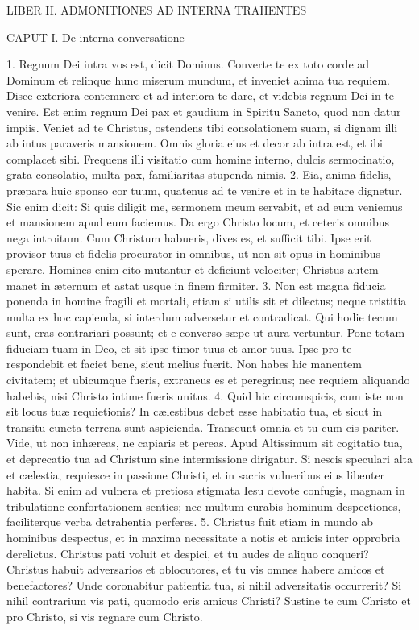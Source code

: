 \documentclass[twoside]{article}
\begin{document}
LIBER II.
ADMONITIONES AD INTERNA TRAHENTES


CAPUT I.
De interna conversatione

1. Regnum Dei intra vos est, dicit Dominus. Converte te ex toto corde ad Dominum et relinque hunc miserum mundum, et inveniet anima tua requiem. Disce exteriora contemnere et ad interiora te dare, et videbis regnum Dei in te venire. Est enim regnum Dei pax et gaudium in Spiritu Sancto, quod non datur impiis. Veniet ad te Christus, ostendens tibi consolationem suam, si dignam illi ab intus paraveris mansionem. Omnis gloria eius et decor ab intra est, et ibi complacet sibi. Frequens illi visitatio cum homine interno, dulcis sermocinatio, grata consolatio, multa pax, familiaritas stupenda nimis.
2. Eia, anima fidelis, præpara huic sponso cor tuum, quatenus ad te venire et in te habitare dignetur. Sic enim dicit: Si quis diligit me, sermonem meum servabit, et ad eum veniemus et mansionem apud eum faciemus. Da ergo Christo locum, et ceteris omnibus nega introitum. Cum Christum habueris, dives es, et sufficit tibi. Ipse erit provisor tuus et fidelis procurator in omnibus, ut non sit opus in hominibus sperare. Homines enim cito mutantur et deficiunt velociter; Christus autem manet in æternum et astat usque in finem firmiter.
3. Non est magna fiducia ponenda in homine fragili et mortali, etiam si utilis sit et dilectus; neque tristitia multa ex hoc capienda, si interdum adversetur et contradicat. Qui hodie tecum sunt, cras contrariari possunt; et e converso sæpe ut aura vertuntur. Pone totam fiduciam tuam in Deo, et sit ipse timor tuus et amor tuus. Ipse pro te respondebit et faciet bene, sicut melius fuerit. Non habes hic manentem civitatem; et ubicumque fueris, extraneus es et peregrinus; nec requiem aliquando habebis, nisi Christo intime fueris unitus.
4. Quid hic circumspicis, cum iste non sit locus tuæ requietionis? In cælestibus debet esse habitatio tua, et sicut in transitu cuncta terrena sunt aspicienda. Transeunt omnia et tu cum eis pariter. Vide, ut non inhæreas, ne capiaris et pereas. Apud Altissimum sit cogitatio tua, et deprecatio tua ad Christum sine intermissione dirigatur. Si nescis speculari alta et cælestia, requiesce in passione Christi, et in sacris vulneribus eius libenter habita. Si enim ad vulnera et pretiosa stigmata Iesu devote confugis, magnam in tribulatione confortationem senties; nec multum curabis hominum despectiones, faciliterque verba detrahentia perferes.
5. Christus fuit etiam in mundo ab hominibus despectus, et in maxima necessitate a notis et amicis inter opprobria derelictus. Christus pati voluit et despici, et tu audes de aliquo conqueri? Christus habuit adversarios et oblocutores, et tu vis omnes habere amicos et benefactores? Unde coronabitur patientia tua, si nihil adversitatis occurrerit? Si nihil contrarium vis pati, quomodo eris amicus Christi? Sustine te cum Christo et pro Christo, si vis regnare cum Christo.
\end{document}
